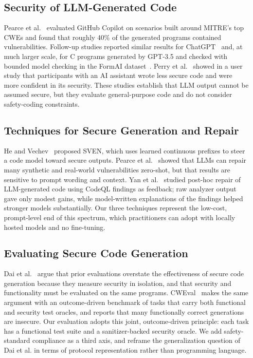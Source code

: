 \documentclass[12pt]{IEEEtran}
\begin{document}
\subsection{Security of LLM-Generated Code}
Pearce et al.~\cite{pearce2022asleep} evaluated GitHub Copilot on scenarios built around MITRE's top CWEs and found that roughly 40\% of the generated programs contained vulnerabilities. Follow-up studies reported similar results for ChatGPT~\cite{khoury2023chatgpt} and, at much larger scale, for C programs generated by GPT-3.5 and checked with bounded model checking in the FormAI dataset~\cite{tihanyi2023formai}. Perry et al.~\cite{perry2023users} showed in a user study that participants with an AI assistant wrote less secure code and were more confident in its security. These studies establish that LLM output cannot be assumed secure, but they evaluate general-purpose code and do not consider safety-coding constraints.

\subsection{Techniques for Secure Generation and Repair}
He and Vechev~\cite{he2023sven} proposed SVEN, which uses learned continuous prefixes to steer a code model toward secure outputs. Pearce et al.~\cite{pearce2023zeroshot} showed that LLMs can repair many synthetic and real-world vulnerabilities zero-shot, but that results are sensitive to prompt wording and context. Yan et al.~\cite{yan2025guiding} studied post-hoc repair of LLM-generated code using CodeQL findings as feedback; raw analyzer output gave only modest gains, while model-written explanations of the findings helped stronger models substantially. Our three techniques represent the low-cost, prompt-level end of this spectrum, which practitioners can adopt with locally hosted models and no fine-tuning.

\subsection{Evaluating Secure Code Generation}
Dai et al.~\cite{rethinking2026} argue that prior evaluations overstate the effectiveness of secure code generation because they measure security in isolation, and that security and functionality must be evaluated on the same programs. CWEval~\cite{peng2025cweval} makes the same argument with an outcome-driven benchmark of tasks that carry both functional and security test oracles, and reports that many functionally correct generations are insecure. Our evaluation adopts this joint, outcome-driven principle: each task has a functional test suite and a sanitizer-backed security oracle. We add safety-standard compliance as a third axis, and reframe the generalization question of Dai et al. in terms of protocol representation rather than programming language.
\end{document}

